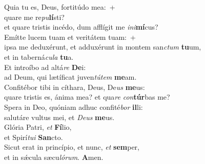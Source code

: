 \evenverse Quia tu es, Deus, fortitúdo mea:~+\\\evenverse  quare me re\textit{pu}\textbf{lí}sti?~\*\\
\evenverse et quare tristis incédo, dum afflígit me \textit{i}\textit{ni}\textbf{mí}cus?\\
\oddverse Emítte lucem tuam et veritátem tuam:~+\\
\oddverse  ipsa me deduxérunt, et adduxérunt in montem san\textit{ctum} \textbf{tu}um,~\*\\
\oddverse et in taberná\textit{cu}\textit{la} \textbf{tu}a.\\
\evenverse Et introíbo ad altá\textit{re} \textbf{De}i:~\*\\
\evenverse ad Deum, qui lætíficat juven\textit{tú}\textit{tem} \textbf{me}am.\\
\oddverse Confitébor tibi in cíthara, Deus, De\textit{us} \textbf{me}us:~\*\\
\oddverse quare tristis es, ánima mea? et qua\textit{re} \textit{con}\textbf{túr}bas me?\\
\evenverse Spera in Deo, quóniam adhuc confité\textit{bor} \textbf{il}li:~\*\\
\evenverse salutáre vultus mei, et \textit{De}\textit{us} \textbf{me}us.\\
\oddverse Glória Patri, \textit{et} \textbf{Fí}lio,~\*\\
\oddverse et Spirí\textit{tu}\textit{i} \textbf{San}cto.\\
\evenverse Sicut erat in princípio, et nunc, \textit{et} \textbf{sem}per,~\*\\
\evenverse et in sǽcula sæcu\textit{ló}\textit{rum}. \textbf{A}men.\\
